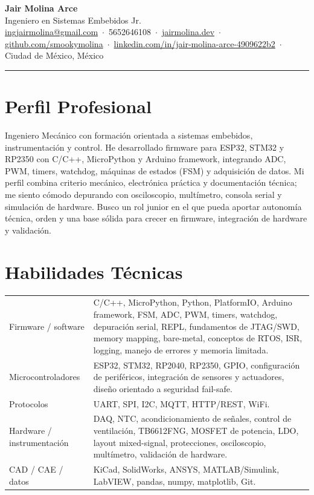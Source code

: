 \documentclass[10pt,a4paper]{article}
\begin{document}
\begin{center}
{\LARGE\bfseries Jair Molina Arce}\\[4pt]
{\large\color{navy} Ingeniero en Sistemas Embebidos Jr.}\\[4pt]
{\small
\href{mailto:ingjairmolina@gmail.com}{ingjairmolina@gmail.com} \,$\cdot$\,
5652646108 \,$\cdot$\,
\href{https://jairmolina.dev}{jairmolina.dev} \,$\cdot$\,
\href{https://github.com/smookymolina}{github.com/smookymolina} \,$\cdot$\,
\href{https://www.linkedin.com/in/jair-molina-arce-4909622b2/}{linkedin.com/in/jair-molina-arce-4909622b2} \,$\cdot$\,
Ciudad de M\'exico, M\'exico}
\end{center}

\vspace{3pt}
\hrule
\vspace{6pt}

\section{Perfil Profesional}
\small
Ingeniero Mec\'anico con formaci\'on orientada a sistemas embebidos, instrumentaci\'on y control. He desarrollado firmware para ESP32, STM32 y RP2350 con C/C++, MicroPython y Arduino framework, integrando ADC, PWM, timers, watchdog, m\'aquinas de estados (FSM) y adquisici\'on de datos. Mi perfil combina criterio mec\'anico, electr\'onica pr\'actica y documentaci\'on t\'ecnica; me siento c\'omodo depurando con osciloscopio, mult\'imetro, consola serial y simulaci\'on de hardware. Busco un rol junior en el que pueda aportar autonom\'ia t\'ecnica, orden y una base s\'olida para crecer en firmware, integraci\'on de hardware y validaci\'on.

\section{Habilidades T\'ecnicas}
\small
\begin{tabularx}{\textwidth}{@{}L@{\hspace{10pt}}X@{}}
Firmware / software & C/C++, MicroPython, Python, PlatformIO, Arduino framework, FSM, ADC, PWM, timers, watchdog, depuraci\'on serial, REPL, fundamentos de JTAG/SWD, memory mapping, bare-metal, conceptos de RTOS, ISR, logging, manejo de errores y memoria limitada.\\[4pt]
Microcontroladores & ESP32, STM32, RP2040, RP2350, GPIO, configuraci\'on de perif\'ericos, integraci\'on de sensores y actuadores, dise\~no orientado a seguridad fail-safe.\\[4pt]
Protocolos & UART, SPI, I2C, MQTT, HTTP/REST, WiFi.\\[4pt]
Hardware / instrumentaci\'on & DAQ, NTC, acondicionamiento de se\~nales, control de ventilaci\'on, TB6612FNG, MOSFET de potencia, LDO, layout mixed-signal, protecciones, osciloscopio, mult\'imetro, validaci\'on de hardware.\\[4pt]
CAD / CAE / datos & KiCad, SolidWorks, ANSYS, MATLAB/Simulink, LabVIEW, pandas, numpy, matplotlib, Git.\\
\end{tabularx}
\end{document}
